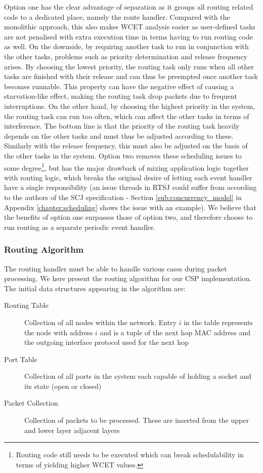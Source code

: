 Option one has the clear advantage of separation as it groups all routing related code to a dedicated place, namely the route handler. Compared with the monolithic approach, this also makes WCET analysis easier as user-defined tasks are not penalised with extra execution time in terms having to run routing code as well. On the downside, by requiring another task to run in conjunction with the other tasks, problems such as priority determination and release frequency arises. By choosing the lowest priority, the routing task only runs when all other tasks are finished with their release and can thus be preempted once another task becomes runnable. This property can have the negative effect of causing a starvation-like effect, making the routing task drop packets due to frequent interruptions. On the other hand, by choosing the highest priority in the system, the routing task can run too often, which can affect the other tasks in terms of interference. The bottom line is that the priority of the routing task heavily depends on the other tasks and must thus be adjusted according to these. Similarly with the release frequency, this must also be adjusted on the basis of the other tasks in the system. Option two removes these scheduling issues to some degree\footnote{Routing code still needs to be executed which can break schedulability in terms of yielding higher WCET values.}, but has the major drawback of mixing application logic together with routing logic, which breaks the original desire of letting each event handler have a single responsibility (an issue threads in RTSJ could suffer from according to the authors of the SCJ specification - Section \ref{sub:concurrency_model} in Appendix \ref{chapter:scheduling} shows the issue with an example). We believe that the benefits of option one surpasses those of option two, and therefore choose to run routing as a separate periodic event handler.

\subsubsection{Routing Algorithm}
The routing handler must be able to handle various cases during packet processing. We here present the routing algorithm for our CSP implementation. The initial data structures appearing in the algorithm are:

\begin{description}
	\item[Routing Table] Collection of all nodes within the network. Entry $i$ in the table represents the node with address $i$ and is a tuple of the next hop MAC address and the outgoing interface protocol used for the next hop 
	\item[Port Table] Collection of all ports in the system each capable of holding a socket and its state (open or closed)
	\item[Packet Collection] Collection of packets to be processed. These are inserted from the upper and lower layer adjacent layers
\end{description} 

